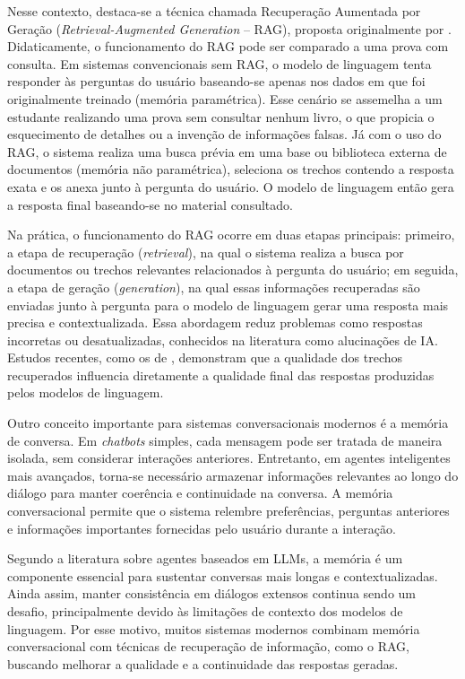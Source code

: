 \documentclass[12pt, openright, oneside, a4paper, brazil]{ads-unipac-abntex2}
\begin{document}
Nesse contexto, destaca-se a técnica chamada Recuperação Aumentada por Geração (\textit{Retrieval-Augmented Generation} -- RAG), proposta originalmente por . Didaticamente, o funcionamento do RAG pode ser comparado a uma prova com consulta. Em sistemas convencionais sem RAG, o modelo de linguagem tenta responder às perguntas do usuário baseando-se apenas nos dados em que foi originalmente treinado (memória paramétrica). Esse cenário se assemelha a um estudante realizando uma prova sem consultar nenhum livro, o que propicia o esquecimento de detalhes ou a invenção de informações falsas. Já com o uso do RAG, o sistema realiza uma busca prévia em uma base ou biblioteca externa de documentos (memória não paramétrica), seleciona os trechos contendo a resposta exata e os anexa junto à pergunta do usuário. O modelo de linguagem então gera a resposta final baseando-se no material consultado.

Na prática, o funcionamento do RAG ocorre em duas etapas principais: primeiro, a etapa de recuperação (\textit{retrieval}), na qual o sistema realiza a busca por documentos ou trechos relevantes relacionados à pergunta do usuário; em seguida, a etapa de geração (\textit{generation}), na qual essas informações recuperadas são enviadas junto à pergunta para o modelo de linguagem gerar uma resposta mais precisa e contextualizada. Essa abordagem reduz problemas como respostas incorretas ou desatualizadas, conhecidos na literatura como alucinações de IA. Estudos recentes, como os de , demonstram que a qualidade dos trechos recuperados influencia diretamente a qualidade final das respostas produzidas pelos modelos de linguagem.

Outro conceito importante para sistemas conversacionais modernos é a memória de conversa. Em \textit{chatbots} simples, cada mensagem pode ser tratada de maneira isolada, sem considerar interações anteriores. Entretanto, em agentes inteligentes mais avançados, torna-se necessário armazenar informações relevantes ao longo do diálogo para manter coerência e continuidade na conversa. A memória conversacional permite que o sistema relembre preferências, perguntas anteriores e informações importantes fornecidas pelo usuário durante a interação.

Segundo a literatura sobre agentes baseados em LLMs, a memória é um componente essencial para sustentar conversas mais longas e contextualizadas. Ainda assim, manter consistência em diálogos extensos continua sendo um desafio, principalmente devido às limitações de contexto dos modelos de linguagem. Por esse motivo, muitos sistemas modernos combinam memória conversacional com técnicas de recuperação de informação, como o RAG, buscando melhorar a qualidade e a continuidade das respostas geradas.
\end{document}
